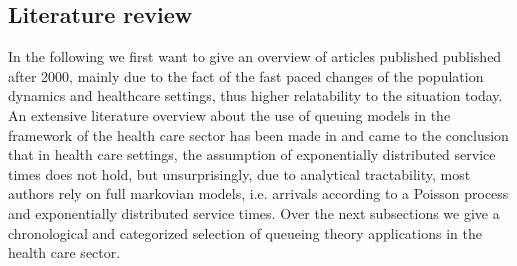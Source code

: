 \documentclass[11pt,a4paper]{article}
\begin{document}
\begin{spacing}{1.8}
\subsection{Literature review}
In the following we first want to give an overview of articles published  published after 2000, mainly due to the fact  of the fast paced changes of the population dynamics and healthcare settings, thus higher relatability to the situation today.
An extensive literature overview about the use of queuing models in the framework of the health care sector has been made in \citet{Lakshmi2013}
\citet{Brahimi1991} and \citet{Dittus1996} came to the conclusion that in health care settings, the assumption of exponentially 
distributed service times does not hold, but unsurprisingly, due to analytical tractability, most authors rely on full markovian models, i.e. arrivals according to a Poisson process and exponentially distributed service times. 
Over the next subsections we give a chronological and categorized selection of queueing theory applications in the health care sector.


\end{spacing}
\end{document}
